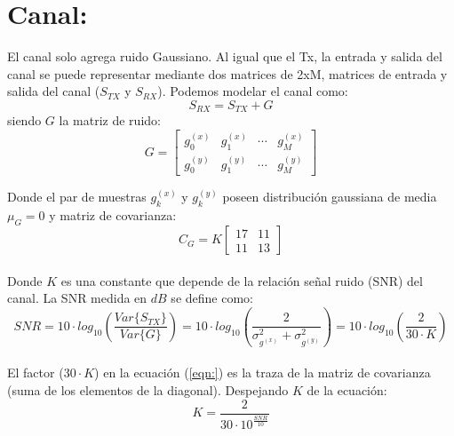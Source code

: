 \documentclass	[12pt,A4paper,titlepage]{article}
\begin{document}
\section{Canal:}
El canal solo agrega ruido Gaussiano. Al igual que el Tx, la entrada y salida del canal se puede representar mediante dos matrices de 2xM, matrices de entrada y salida del canal ($S_{TX}$ y $S_{RX}$). Podemos modelar el canal como:
\begin{equation}
	S_{RX}=S_{TX}+G
\end{equation}
siendo $G$ la matriz de ruido:
\begin{equation}
G = 
\begin{bmatrix}
g_0 ^{(x)} & g_1 ^{(x)} & \cdots & g_M ^{(x)} \\
g_0 ^{(y)} & g_1 ^{(y)} & \cdots & g_M ^{(y)}
\end{bmatrix}
\end{equation}

Donde el par de muestras $g_k ^{(x)}$ y $ g_k ^{(y)}$ poseen distribución gaussiana de media $\mu_G=0$ y matriz de covarianza:
\\
\begin{equation}
C_G = K
\begin{bmatrix}
17 & 11 \\
11 & 13
\end{bmatrix}
\end{equation}
\\
Donde $K$ es una constante que depende de la relación señal ruido (SNR) del canal. La SNR medida en $ dB $ se define como:
\\
\begin{equation}\label{eqn:}
	SNR=10\cdot log_{10}\left(  \dfrac{Var \{S_{TX}\} }{Var\{G\}} \right) 
	   =10\cdot log_{10}\left(  \dfrac{2}{\sigma_{g^{(x)}}^2  +  \sigma_{g^{(y)}}^2} \right)
	   =10\cdot log_{10}\left(  \dfrac{2}{30\cdot K} \right)
\end{equation}
\\
El factor ($30\cdot K$) en la ecuación (\ref*{eqn:}) es la traza de la matriz de covarianza (suma de los elementos de la diagonal). Despejando $K$ de la ecuación:
\begin{equation}
	K=\dfrac{2}{30 \cdot 10^{\frac{SNR}{10}}}
\end{equation}
\end{document}
